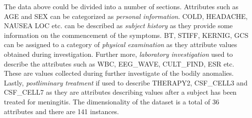 The data above could be divided into a number of sections. Attributes such as AGE and SEX can be categorized as \textit{personal information}. COLD, HEADACHE, NAUSEA LOC etc. can be described as \textit{subject history} as they provide some information on the commencement of the symptoms. BT, STIFF, KERNIG, GCS can be assigned to a category of \textit{physical examination} as they attribute values obtained during investigation. Further more, \textit{laboratory investigation} used to describe the attributes such as WBC, EEG\_WAVE, CULT\_FIND, ESR etc. These are values collected during further investigate of the bodily anomalies. Lastly, \textit{postliminary treatment} if used to describe THERAPY2, CSF\_CELL3 and CSF\_CELL7 as they are attributes describing values after a subject has been treated for meningitis. 
The dimensionality of the dataset is a total of 36 attributes and there are 141 instances.

